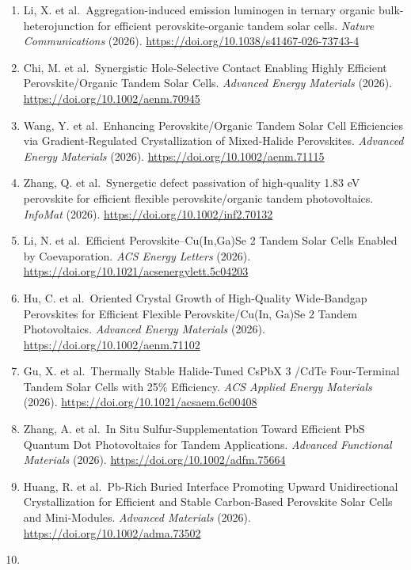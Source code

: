 \documentclass[
  11pt,
]{article}
\begin{document}
\begin{enumerate}
  wide-bandgap perovskite for perovskite-organic tandem solar cells.
  \emph{Science Advances} (2026).
  \url{https://doi.org/10.1126/sciadv.aed2200}
\item
  Li, X. et al.~Aggregation-induced emission luminogen in ternary
  organic bulk-heterojunction for efficient perovskite-organic tandem
  solar cells. \emph{Nature Communications} (2026).
  \url{https://doi.org/10.1038/s41467-026-73743-4}
\item
  Chi, M. et al.~Synergistic Hole‐Selective Contact Enabling Highly
  Efficient Perovskite/Organic Tandem Solar Cells. \emph{Advanced Energy
  Materials} (2026). \url{https://doi.org/10.1002/aenm.70945}
\item
  Wang, Y. et al.~Enhancing Perovskite/Organic Tandem Solar Cell
  Efficiencies via Gradient‐Regulated Crystallization of Mixed‐Halide
  Perovskites. \emph{Advanced Energy Materials} (2026).
  \url{https://doi.org/10.1002/aenm.71115}
\item
  Zhang, Q. et al.~Synergetic defect passivation of high‐quality 1.83 eV
  perovskite for efficient flexible perovskite/organic tandem
  photovoltaics. \emph{InfoMat} (2026).
  \url{https://doi.org/10.1002/inf2.70132}
\item
  Li, N. et al.~Efficient Perovskite--Cu(In,Ga)Se 2 Tandem Solar Cells
  Enabled by Coevaporation. \emph{ACS Energy Letters} (2026).
  \url{https://doi.org/10.1021/acsenergylett.5c04203}
\item
  Hu, C. et al.~Oriented Crystal Growth of High‐Quality Wide‐Bandgap
  Perovskites for Efficient Flexible Perovskite/Cu(In, Ga)Se 2 Tandem
  Photovoltaics. \emph{Advanced Energy Materials} (2026).
  \url{https://doi.org/10.1002/aenm.71102}
\item
  Gu, X. et al.~Thermally Stable Halide-Tuned CsPbX 3 /CdTe
  Four-Terminal Tandem Solar Cells with 25\% Efficiency. \emph{ACS
  Applied Energy Materials} (2026).
  \url{https://doi.org/10.1021/acsaem.6c00408}
\item
  Zhang, A. et al.~In Situ Sulfur‐Supplementation Toward Efficient PbS
  Quantum Dot Photovoltaics for Tandem Applications. \emph{Advanced
  Functional Materials} (2026). \url{https://doi.org/10.1002/adfm.75664}
\item
  Huang, R. et al.~Pb‐Rich Buried Interface Promoting Upward
  Unidirectional Crystallization for Efficient and Stable Carbon‐Based
  Perovskite Solar Cells and Mini‐Modules. \emph{Advanced Materials}
  (2026). \url{https://doi.org/10.1002/adma.73502}
\item

\end{enumerate}
\end{document}
